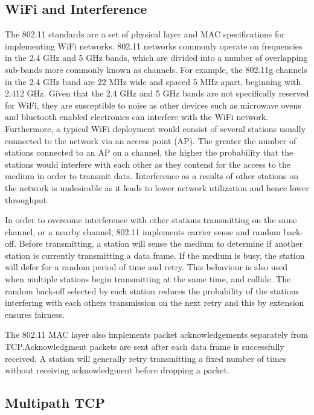 
\subsection{WiFi and Interference}


The 802.11 standards are a set of physical layer and MAC specifications for
implementing WiFi networks. 802.11 networks commonly operate on frequencies in
the 2.4 GHz and 5 GHz bands, which are divided into a number of overlapping
sub-bands more commonly known as channels. For example, the 802.11g channels in
the 2.4 GHz band are 22 MHz wide and spaced 5 MHz apart, beginning with 2.412
GHz. Given that the 2.4 GHz and 5 GHz bands are not specifically reserved for
WiFi, they are susceptible to noise as other devices such as microwave ovens and
bluetooth enabled electronics can interfere with the WiFi network. Furthermore,
a typical WiFi deployment would consist of several stations usually connected to
the network via an access point (AP). The greater the number of stations
connected to an AP on a channel, the higher the probability that the stations
would interfere with each other as they contend for the access to the medium in
order to transmit data. Interference as a results of other stations on the
network is undesirable as it leads to lower network utilization and hence lower
throughput.

In order to overcome interference with other stations transmitting on the same
channel, or a nearby channel, 802.11 implements carrier sense and random
back-off. Before transmitting, a station will sense the medium to determine if
another station is currently transmitting a data frame. If the medium is busy,
the station will defer for a random period of time and retry. This behaviour is
also used when multiple stations begin transmitting at the same time, and
collide. The random back-off selected by each station reduces the probability of
the stations interfering with each others transmission on the next retry and
this by extension ensures fairness.

The 802.11 MAC layer also implements packet acknowledgements separately from
TCP.\@ Acknowledgment packets are sent after each data frame is successfully
received. A station will generally retry transmitting a fixed number of times
without receiving acknowledgment before dropping a packet.

\subsection{Multipath TCP}

